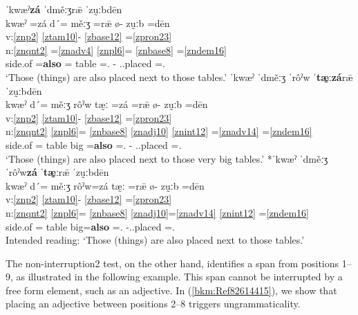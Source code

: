 \documentclass[output=paper]{langscibook}
\begin{document}
\ea\label{bkm:Ref90290667}
{ˈkwæˀ\textbf{zá} \textbf{ˈ}dměːʒrǣ ˈzṵːbdēn}\\
\gllll kwæˀ =zá d´= měːʒ =rǣ ø- zṵːb =dēn\\
v:\ref{znp2} {} {} {} {} \ref{ztam10}- \ref{zbase12} =\ref{zpron23} \\
n:\ref{znqnt2} =\ref{znadv4} \ref{znpl6}= \ref{znbase8} =\ref{zndem16}  \\
side.of =\textbf{also} \Pl{}= table =\Dem.\Dist{} \Stat{}- \Pos.\V{}.placed =\Third\Pl{}.\Inan{}\\
\glt `Those (things) are also placed next to those tables.'
\ex\label{bkm:Ref90290710}
{ˈkwæˀ   ˈdměːʒ ˈrôˀw ˈ\textbf{tæ̰}ː\textbf{zá}rǣ ˈzṵːbdēn}\\
\gllll kwæˀ d´= měːʒ rôˀw tæ̰ː =zá =rǣ ø- zṵːb =dēn\\
v:\ref{znp2} {} {} {} {} {} {} \ref{ztam10}- \ref{zbase12} =\ref{zpron23} \\
n:\ref{znqnt2} \ref{znpl6}= \ref{znbase8} \ref{znadj10} \ref{znint12} =\ref{znadv14} =\ref{zndem16}  \\
side.of \Pl{}= table big \textbf{\Intens{}} =\textbf{also} =\Dem.\Dist{} \Stat{}- \Pos.\V{}.placed =\Third\Pl.\Inan{}\\
\glt `Those (things) are also placed next to those very big tables.'
\ex\label{bkm:Ref90290752}
{*ˈkwæˀ ˈdměːʒ ˈrôˀw\textbf{zá} ˈ\textbf{tæ̰}ːrǣ   ˈzṵːbdēn}\\
\gllll kwæˀ d´= měːʒ rôˀw=zá tæ̰ː =rǣ ø- zṵːb =dēn\\
v:\ref{znp2} {} {} {} {} {} \ref{ztam10}- \ref{zbase12} =\ref{zpron23} \\
n:\ref{znqnt2} \ref{znpl6}= \ref{znbase8} \ref{znadj10}=\ref{znadv14} \ref{znint12} =\ref{zndem16} \\
side.of \Pl{}= table big=\textbf{also} \textbf{\Intens{}} =\Dem.\Dist{} \Stat{} -\Pos.\V{}.placed =\Third\Pl.\Inan{}\\
\glt Intended reading: `Those (things) are also placed next to those tables.'
\z

The non-interruption2 test, on the other hand, identifies a span from positions 1–9, as illustrated in the following example. This span cannot be interrupted by a free form element, such as an adjective. In (\ref{bkm:Ref82614415}), we show that placing an adjective between positions 2–8 triggers ungrammaticality.
\end{document}
